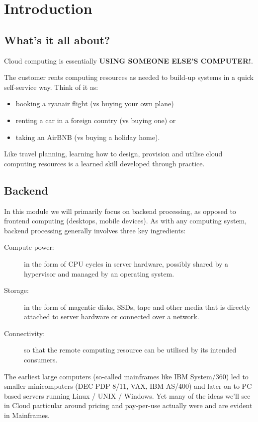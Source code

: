 \chapter{Introduction}
\label{ch:intro}

\section{What's it all about?}
\label{sec:whats-it-all-about}

Cloud computing is essentially \textbf{USING SOMEONE ELSE'S COMPUTER!}.

The customer rents computing resources as needed to
build-up systems in a quick self-service way. Think of it as:
\begin{itemize}
\item booking a ryanair flight (vs buying your own plane)
\item renting a car in a foreign country (vs buying one) or
\item taking an AirBNB (vs buying a holiday home).
\end{itemize}

Like travel planning, learning how to design, provision and utilise
cloud computing resources is a learned skill developed through practice.

\section{Backend}
\label{sec:backend}

In this module we will primarily focus on backend processing, as opposed to frontend computing (desktops, mobile devices).
As with any computing system, backend processing generally involves three key ingredients:

\begin{description}
\item[Compute power:]
in the form of CPU cycles in server hardware, possibly shared by a
hypervisor and managed by an operating system.
\item[Storage:]
in the form of magentic disks, SSDs, tape and other media that is
directly attached to server hardware or connected over a network.
\item[Connectivity:]
so that the remote computing resource can be utilised by its intended
consumers.
\end{description}

The earliest large computers (so-called mainframes like IBM System/360)
led to smaller minicomputers (DEC PDP 8/11, VAX, IBM AS/400) and later
on to PC-based servers running Linux / UNIX / Windows. Yet many of the
ideas we'll see in Cloud particular around pricing and pay-per-use
actually were and are evident in Mainframes.

